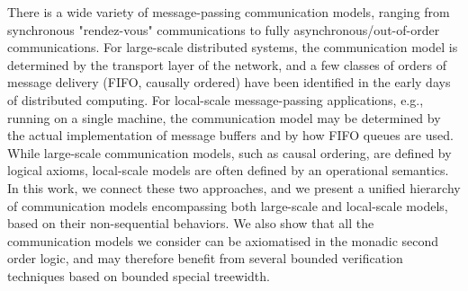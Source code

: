 There is a wide variety of message-passing communication models, ranging from synchronous "rendez-vous"
communications to fully asynchronous/out-of-order communications. For large-scale distributed systems, the
communication model is determined by the transport layer of the network, and a few classes of 
orders of message delivery (FIFO, causally ordered) have been identified in the early days of 
distributed computing. For local-scale message-passing applications, 
e.g., running on a single machine, the communication model may be determined by the actual implementation of 
message buffers and by how FIFO queues are used. While large-scale communication
models, such as causal ordering, are defined by logical axioms, local-scale models are often defined by an operational
semantics. In this work, we connect these two approaches, and we present a unified hierarchy of communication
models encompassing both large-scale and local-scale models, based on their non-sequential behaviors.
We also show that all the communication models we consider can be axiomatised in the monadic second order logic, 
and may therefore benefit from several bounded verification techniques based on bounded special treewidth.
